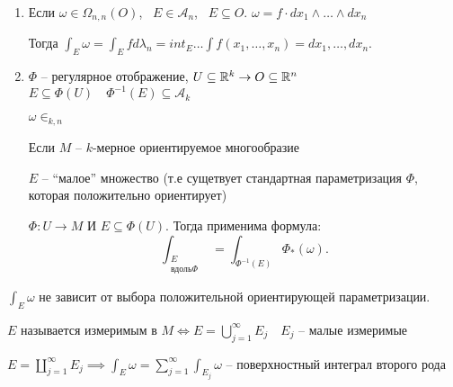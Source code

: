 \begin{definition}

    \begin{enumerate}
        \item Если $\omega \in \Omega_{n, n} (O)$, ~$E \in \mathcal A_n$, ~$E \subseteq O$.
        $\omega = f\cdot dx_1 \wedge \ldots \wedge dx_n$
  
        Тогда $\int_E \omega = \int_E f d\lambda_n  = int_E \dots \int f(x_1, \ldots, x_n) = dx_1, \ldots, dx_n$. 
        \item $\Phi$ -- регулярное отображение, $U\subseteq \mathbb{R}^k \to O\subseteq \mathbb{R}^n$
        $E\subseteq \Phi(U)\quad \Phi^{-1}(E)\subseteq \mathcal A_k$

        $\omega\in _{k,n}$


        Если $M$ -- $k$-мерное ориентируемое многообразие

        $E$ -- ``малое'' множество (т.е сущетвует стандартная параметризация $\Phi$, которая положительно ориентирует)

        $\Phi: U \to M$ И $E\subseteq \Phi(U)$. Тогда применима формула:
        \[
        \int_{\substack{E\\ \text{вдоль} \Phi}} = \int_{\Phi^{-1}(E)} \Phi_*(\omega)
        .\] 
    \end{enumerate}
\end{definition}

\begin{note}
    [Факт]

    $\int_E \omega$ не зависит от выбора положительной ориентирующей параметризации.
\end{note}

\begin{note}
    $E$ называется измеримым в $M \iff E = \bigcup\limits_{j=1}^{\infty}E_j\quad E_j$ -- малые измеримые 

    $E = \coprod_{j=1}^{\infty }E_j \implies \int_E\omega = \sum_{j=1}^{\infty } \int_{E_j}\omega$ -- поверхностный интеграл второго рода
\end{note}

